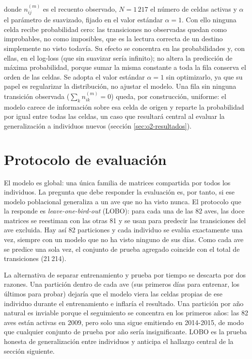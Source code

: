 donde $n^{(m)}_{ij}$ es el recuento observado, $N = 1\,217$ el número de celdas
activas y $\alpha$ el parámetro de suavizado, fijado en el valor estándar
$\alpha = 1$. Con ello ninguna celda recibe probabilidad cero: las transiciones no
observadas quedan como improbables, no como imposibles, que es la lectura correcta de
un destino simplemente no visto todavía. Su efecto se concentra en las probabilidades
y, con ellas, en el log-loss (que sin suavizar sería infinito); no altera la predicción
de máxima probabilidad, porque sumar la misma constante a toda la fila conserva el orden
de las celdas. Se adopta el valor estándar $\alpha = 1$ sin optimizarlo, ya que su papel
es regularizar la distribución, no ajustar el modelo. Una fila sin ninguna transición
observada ($\sum_{k} n^{(m)}_{ik} = 0$) queda, por construcción, uniforme: el modelo
carece de información sobre esa celda de origen y reparte la probabilidad por igual entre
todas las celdas, un caso que resultará central al evaluar la generalización a individuos
nuevos (sección \ref{sec:o2-resultados}).

\section{Protocolo de evaluación}
\label{sec:o2-evaluacion}

El modelo es global: una única familia de matrices compartida por todos los
individuos. La pregunta que debe responder la evaluación es, por tanto, si ese modelo
poblacional generaliza a un ave que no ha visto nunca. El protocolo que la responde es
\emph{leave-one-bird-out} (LOBO): para cada una de las 82 aves, las doce matrices se
reestiman con las otras 81 y se usan para predecir las transiciones del ave excluida.
Hay así 82 particiones y cada individuo se evalúa exactamente una vez, siempre con un
modelo que no ha visto ninguno de sus días. Como cada ave se predice una sola vez, el
conjunto de prueba agregado coincide con el total de transiciones (21\,214).

La alternativa de separar entrenamiento y prueba por tiempo se descarta por dos
razones. Una partición dentro de cada ave (sus primeros días para entrenar, los
últimos para probar) dejaría que el modelo viera las celdas propias de ese individuo
durante el entrenamiento e inflaría el resultado. Una partición por año natural es
inviable porque el seguimiento se concentra en los primeros años: las 82 aves están
activas en 2009, pero solo una sigue emitiendo en 2014-2015, de modo que cualquier
conjunto de prueba por año sería insignificante. LOBO es la prueba honesta de
generalización entre individuos y anticipa el hallazgo central de la sección
siguiente.

